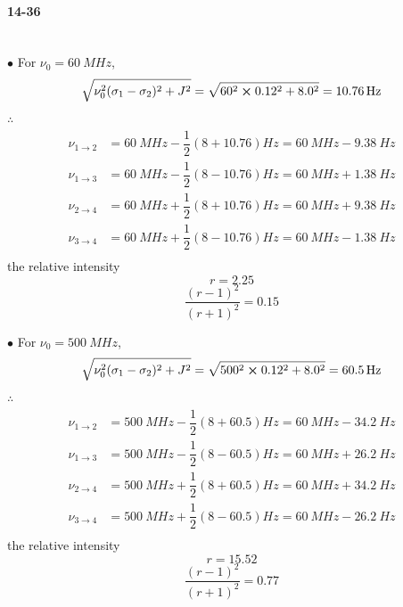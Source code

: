 \documentclass[a4paper]{article}
\DeclareMathOperator{\ra}{\rightarrow}
\newcommand{\ex}[1]{\paragraph{14-#1}}
\numberwithin{equation}{section}
\begin{document}
\ex{36}
~\\$ \bullet $ For $ \nu_0 = \SI{60}{MHz} $,
\begin{align}
\sqrt{\nu_0^2(\sigma_1-\sigma_2)^2 + J^2} = \sqrt{60^2\cross 0.12^2 + 8.0^2} = \SI{10.76}{Hz}
\end{align}
$ \therefore $
\begin{align}
\nu_{1\ra 2} &= \SI{60}{MHz} - \dfrac{1}{2}(8 + 10.76)\si{Hz} = \SI{60}{MHz} - \SI{9.38}{Hz} \\
\nu_{1\ra 3} &= \SI{60}{MHz} - \dfrac{1}{2}(8 - 10.76)\si{Hz} = \SI{60}{MHz} + \SI{1.38}{Hz} \\
\nu_{2\ra 4} &= \SI{60}{MHz} + \dfrac{1}{2}(8 + 10.76)\si{Hz} = \SI{60}{MHz} + \SI{9.38}{Hz} \\
\nu_{3\ra 4} &= \SI{60}{MHz} + \dfrac{1}{2}(8 - 10.76)\si{Hz} = \SI{60}{MHz} - \SI{1.38}{Hz} \\
\end{align}
the relative intensity
\begin{equation}\label{key}
r = 2.25
\end{equation}
\begin{equation}\label{key}
\dfrac{(r-1)^2}{(r+1)^2} = 0.15
\end{equation}

$ \bullet $ For $ \nu_0 = \SI{500}{MHz} $,
\begin{align}
\sqrt{\nu_0^2(\sigma_1-\sigma_2)^2 + J^2} = \sqrt{500^2\cross 0.12^2 + 8.0^2} = \SI{60.5}{Hz}
\end{align}
$ \therefore $
\begin{align}
\nu_{1\ra 2} &= \SI{500}{MHz} - \dfrac{1}{2}(8 + 60.5)\si{Hz} = \SI{60}{MHz} - \SI{34.2}{Hz} \\
\nu_{1\ra 3} &= \SI{500}{MHz} - \dfrac{1}{2}(8 - 60.5)\si{Hz} = \SI{60}{MHz} + \SI{26.2}{Hz} \\
\nu_{2\ra 4} &= \SI{500}{MHz} + \dfrac{1}{2}(8 + 60.5)\si{Hz} = \SI{60}{MHz} + \SI{34.2}{Hz} \\
\nu_{3\ra 4} &= \SI{500}{MHz} + \dfrac{1}{2}(8 - 60.5)\si{Hz} = \SI{60}{MHz} - \SI{26.2}{Hz} \\
\end{align}
the relative intensity
\begin{equation}\label{key}
r = 15.52
\end{equation}
\begin{equation}\label{key}
\dfrac{(r-1)^2}{(r+1)^2} = 0.77
\end{equation}
\end{document}
